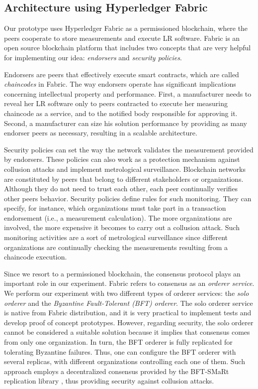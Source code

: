 \documentclass[journal]{IEEEtran}
\begin{document}
\subsection{Architecture using Hyperledger Fabric}
Our prototype uses Hyperledger Fabric \cite{Androulaki2018} as a permissioned blockchain, where the peers cooperate to store measurements and execute LR software.
Fabric is an open source blockchain platform that includes two concepts that are very helpful for implementing our idea: \emph{endorsers} and \emph{security policies}.

Endorsers are peers that effectively execute smart contracts, which are called \emph{chaincodes} in Fabric.
The way endorsers operate has significant implications concerning intellectual property and performance.
First, a manufacturer needs to reveal her LR software only to peers contracted to execute her measuring chaincode as a service, and to the notified body responsible for approving it.
Second, a manufacturer can size his solution performance by providing as many endorser peers as necessary, resulting in a scalable architecture.

Security policies can set the way the network validates the measurement provided by endorsers.
These policies can also work as a protection mechanism against collusion attacks and implement metrological surveillance.
Blockchain networks are constituted by peers that belong to different stakeholders or organizations.
Although they do not need to trust each other, each peer continually verifies other peers behavior.
Security policies define rules for such monitoring.
They can specify, for instance, which organizations must take part in a transaction endorsement (i.e., a measurement calculation).
The more organizations are involved, the more expensive it becomes to carry out a collusion attack.
Such monitoring activities are a sort of metrological surveillance since different organizations are continually checking the measurements resulting from a chaincode execution.

Since we resort to a permissioned blockchain, the consensus protocol plays an important role in our experiment.
Fabric refers to consensus as an \emph{orderer service}.
We perform our experiment with two different types of orderer services: the \emph{solo orderer} and the \emph{Byzantine Fault-Tolerant (BFT) orderer}.
The solo orderer service is native from Fabric distribution, and it is very practical to implement tests and develop proof of concept prototypes.
However, regarding security, the solo orderer cannot be considered a suitable solution because it implies that consensus comes from only one organization.
In turn, the BFT orderer \cite{Sousa2018} is fully replicated for tolerating Byzantine failures.
Thus, one can configure the BFT orderer with several replicas, with different organizations controlling each one of them.
Such approach employs a decentralized consensus provided by the BFT-SMaRt replication library \cite{Bessani2014}, thus providing security against collusion attacks.
\end{document}
